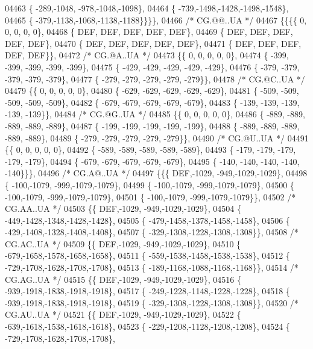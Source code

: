 \begin{DoxyCode}
04463 \{ -289,-1048, -978,-1048,-1098\},
04464 \{ -739,-1498,-1428,-1498,-1548\},
04465 \{ -379,-1138,-1068,-1138,-1188\}\}\}\},
04466 \textcolor{comment}{/* CG.@@..UA */}
04467 \{\{\{\{    0,    0,    0,    0,    0\},
04468 \{  DEF,  DEF,  DEF,  DEF,  DEF\},
04469 \{  DEF,  DEF,  DEF,  DEF,  DEF\},
04470 \{  DEF,  DEF,  DEF,  DEF,  DEF\},
04471 \{  DEF,  DEF,  DEF,  DEF,  DEF\}\},
04472 \textcolor{comment}{/* CG.@A..UA */}
04473 \{\{    0,    0,    0,    0,    0\},
04474 \{ -399, -399, -399, -399, -399\},
04475 \{ -429, -429, -429, -429, -429\},
04476 \{ -379, -379, -379, -379, -379\},
04477 \{ -279, -279, -279, -279, -279\}\},
04478 \textcolor{comment}{/* CG.@C..UA */}
04479 \{\{    0,    0,    0,    0,    0\},
04480 \{ -629, -629, -629, -629, -629\},
04481 \{ -509, -509, -509, -509, -509\},
04482 \{ -679, -679, -679, -679, -679\},
04483 \{ -139, -139, -139, -139, -139\}\},
04484 \textcolor{comment}{/* CG.@G..UA */}
04485 \{\{    0,    0,    0,    0,    0\},
04486 \{ -889, -889, -889, -889, -889\},
04487 \{ -199, -199, -199, -199, -199\},
04488 \{ -889, -889, -889, -889, -889\},
04489 \{ -279, -279, -279, -279, -279\}\},
04490 \textcolor{comment}{/* CG.@U..UA */}
04491 \{\{    0,    0,    0,    0,    0\},
04492 \{ -589, -589, -589, -589, -589\},
04493 \{ -179, -179, -179, -179, -179\},
04494 \{ -679, -679, -679, -679, -679\},
04495 \{ -140, -140, -140, -140, -140\}\}\},
04496 \textcolor{comment}{/* CG.A@..UA */}
04497 \{\{\{  DEF,-1029, -949,-1029,-1029\},
04498 \{ -100,-1079, -999,-1079,-1079\},
04499 \{ -100,-1079, -999,-1079,-1079\},
04500 \{ -100,-1079, -999,-1079,-1079\},
04501 \{ -100,-1079, -999,-1079,-1079\}\},
04502 \textcolor{comment}{/* CG.AA..UA */}
04503 \{\{  DEF,-1029, -949,-1029,-1029\},
04504 \{ -449,-1428,-1348,-1428,-1428\},
04505 \{ -479,-1458,-1378,-1458,-1458\},
04506 \{ -429,-1408,-1328,-1408,-1408\},
04507 \{ -329,-1308,-1228,-1308,-1308\}\},
04508 \textcolor{comment}{/* CG.AC..UA */}
04509 \{\{  DEF,-1029, -949,-1029,-1029\},
04510 \{ -679,-1658,-1578,-1658,-1658\},
04511 \{ -559,-1538,-1458,-1538,-1538\},
04512 \{ -729,-1708,-1628,-1708,-1708\},
04513 \{ -189,-1168,-1088,-1168,-1168\}\},
04514 \textcolor{comment}{/* CG.AG..UA */}
04515 \{\{  DEF,-1029, -949,-1029,-1029\},
04516 \{ -939,-1918,-1838,-1918,-1918\},
04517 \{ -249,-1228,-1148,-1228,-1228\},
04518 \{ -939,-1918,-1838,-1918,-1918\},
04519 \{ -329,-1308,-1228,-1308,-1308\}\},
04520 \textcolor{comment}{/* CG.AU..UA */}
04521 \{\{  DEF,-1029, -949,-1029,-1029\},
04522 \{ -639,-1618,-1538,-1618,-1618\},
04523 \{ -229,-1208,-1128,-1208,-1208\},
04524 \{ -729,-1708,-1628,-1708,-1708\},

\end{DoxyCode}
